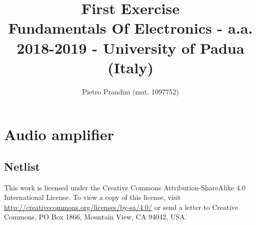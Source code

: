 \documentclass[10pt,a4paper]{article}
\title{First Exercise\\{\small{Fundamentals Of Electronics - a.a. 2018-2019 - University of Padua (Italy)}}}
\author{Pietro Prandini (mat. 1097752)}
\begin{document}
\maketitle
\section{Audio amplifier}
\subsection{Netlist}


\vspace*{\fill}
\centering
\tiny{This work is licensed under the Creative Commons Attribution-ShareAlike 4.0 International License. To view a copy of this license, visit \href{http://creativecommons.org/licenses/by-sa/4.0/}{http://creativecommons.org/licenses/by-sa/4.0/} or send a letter to Creative Commons, PO Box 1866, Mountain View, CA 94042, USA.}
\end{document}
